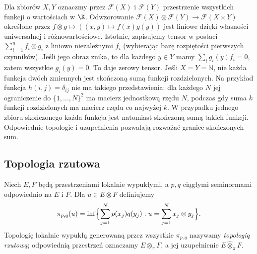 \begin{przyklad}
\label{ex:separable-functions24}
Dla zbiorów $X,Y$ oznaczmy przez $\mathcal F(X)$
i $\mathcal F(Y)$ przestrzenie wszystkich funkcji o
wartościach w $\K$. Odwzorowanie
$\mathcal F(X)\otimes\mathcal F(Y)\to\mathcal F(X\times Y)$
określone przez $f\otimes g\mapsto ((x,y)\mapsto f(x)g(y))$
jest liniowe dzięki własności uniwersalnej i różnowartościowe.
Istotnie, zapisujemy tensor w postaci $\sum_{i=1}^n f_i\otimes g_i$
z liniowo niezależnymi $f_i$ (wybierając bazę rozpiętości
pierwszych czynników). Jeśli jego obraz znika, to dla
każdego $y\in Y$ mamy $\sum_i g_i(y)f_i=0$, zatem
wszystkie $g_i(y)=0$. To daje zerowy tensor.
Jeśli $X=Y=\mathbb N$, nie każda funkcja dwóch zmiennych
jest skończoną sumą funkcji rozdzielonych. Na przykład
funkcja $h(i,j)=\delta_{ij}$ nie ma takiego przedstawienia:
dla każdego $N$ jej ograniczenie do $\{1,\ldots,N\}^2$
ma macierz jednostkową rzędu $N$, podczas gdy suma $k$
funkcji rozdzielonych ma macierz rzędu co najwyżej $k$.
W przypadku jednego zbioru skończonego każda funkcja
jest natomiast skończoną sumą takich funkcji. Odpowiednie
topologie i uzupełnienia pozwalają rozważać granice
skończonych sum.
\end{przyklad}

\subsection{Topologia rzutowa}

\begin{definicja}
\label{def:pi-seminorm24}
Niech $E,F$ będą przestrzeniami lokalnie wypukłymi, a $p,q$
ciągłymi seminormami odpowiednio na $E$ i $F$. Dla
$u\in E\otimes F$ definiujemy
\[
 \pi_{p,q}(u)=\inf\Bigl\{\sum_{j=1}^N p(x_j)q(y_j):
 u=\sum_{j=1}^Nx_j\otimes y_j\Bigr\}.
\]
Topologię lokalnie wypukłą generowaną przez wszystkie
$\pi_{p,q}$ nazywamy \emph{topologią rzutową};
odpowiednią przestrzeń oznaczamy $E\otimes_\pi F$,
a jej uzupełnienie $E\widehat\otimes_\pi F$.
\end{definicja}

